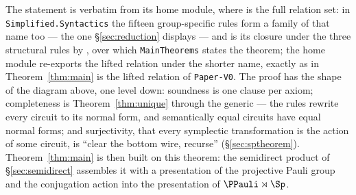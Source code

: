 The statement is verbatim from its home module, where
 is the full relation set: in
\texttt{Simplified.Syntactics} the fifteen group-specific rules form a
family of that name too --- the one \S\ref{sec:reduction} displays ---
and  is its closure under the three
structural rules by , over which
\texttt{MainTheorems} states the theorem; the home module re-exports
the lifted relation under the shorter name, exactly as
 in Theorem~\ref{thm:main} is the lifted
relation of \texttt{Paper-V0}.  The proof has the shape
of the diagram above, one level down: soundness is one clause per
axiom; completeness is Theorem~\ref{thm:unique} through the generic
 --- the rules rewrite every circuit to its
normal form, and semantically equal circuits have equal normal forms;
and surjectivity, that every symplectic transformation is the action of
some circuit, is ``clear the bottom wire, recurse''
(\S\ref{sec:sptheorem}).  Theorem~\ref{thm:main} is then built on this
theorem: the semidirect product of \S\ref{sec:semidirect} assembles it
with a presentation of the projective Pauli group and the conjugation
action into the presentation of $\PPauli \rtimes \Sp$.
